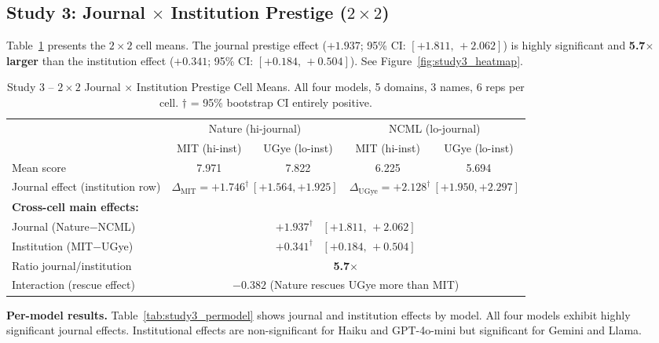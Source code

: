 \documentclass[11pt]{article}
\begin{document}
\subsection{Study 3: Journal $\times$ Institution Prestige ($2\times2$)}

Table~\ref{tab:study3_cells} presents the $2\!\times\!2$ cell means.
The journal prestige effect ($+1.937$; 95\% CI: $[+1.811,\,+2.062]$)
is highly significant and \textbf{5.7$\times$ larger} than the institution
effect ($+0.341$; 95\% CI: $[+0.184,\,+0.504]$).
See Figure~\ref{fig:study3_heatmap}.

\begin{table}[h!]
\centering
\caption{Study 3 -- $2\!\times\!2$ Journal $\times$ Institution Prestige Cell Means.
  All four models, 5 domains, 3 names, 6 reps per cell.
  $\dagger$ = 95\% bootstrap CI entirely positive.}
\label{tab:study3_cells}
\small
\begin{tabular}{lcccc}
\toprule
 & \multicolumn{2}{c}{Nature (hi-journal)} & \multicolumn{2}{c}{NCML (lo-journal)} \\
\cmidrule(lr){2-3}\cmidrule(lr){4-5}
 & MIT (hi-inst) & UGye (lo-inst) & MIT (hi-inst) & UGye (lo-inst) \\
\midrule
Mean score    & 7.971 & 7.822 & 6.225 & 5.694 \\
Journal effect (institution row) & \multicolumn{2}{c}{$\Delta_\mathrm{MIT}=+1.746^\dagger\ [+1.564,+1.925]$}
                                  & \multicolumn{2}{c}{$\Delta_\mathrm{UGye}=+2.128^\dagger\ [+1.950,+2.297]$} \\
\midrule
\multicolumn{5}{l}{\textbf{Cross-cell main effects:}} \\
Journal (Nature$-$NCML)      & \multicolumn{4}{c}{$+1.937^\dagger$ \ $[+1.811,\,+2.062]$} \\
Institution (MIT$-$UGye)     & \multicolumn{4}{c}{$+0.341^\dagger$ \ $[+0.184,\,+0.504]$} \\
Ratio journal/institution    & \multicolumn{4}{c}{\textbf{5.7$\times$}} \\
Interaction (rescue effect)  & \multicolumn{4}{c}{$-0.382$ (Nature rescues UGye more than MIT)} \\
\bottomrule
\end{tabular}
\end{table}

\noindent\textbf{Per-model results.}
Table~\ref{tab:study3_permodel} shows journal and institution effects by model.
All four models exhibit highly significant journal effects.  Institutional effects
are non-significant for Haiku and GPT-4o-mini but significant for Gemini and Llama.
\end{document}
